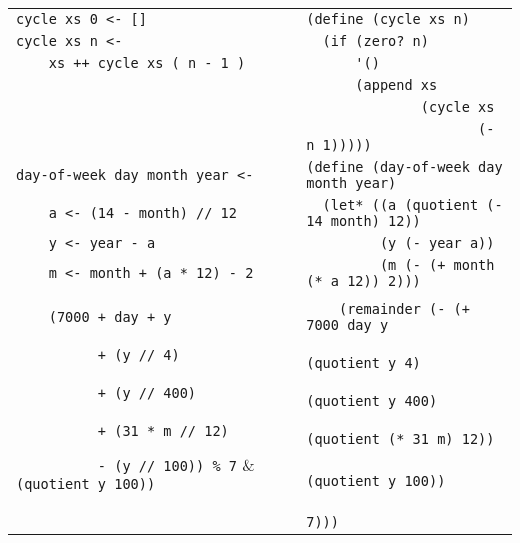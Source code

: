 \begin{table}[ht!]
\begin{tabular}{|l|l|}
            \verb,cycle xs 0 <- [],            & \verb,(define (cycle xs n), \\
            \verb,cycle xs n <- ,              & \verb,  (if (zero? n),\\
            \verb,    xs ++ cycle xs ( n - 1 ),& \verb,      '(), \\
                                               & \verb,      (append xs, \\
                                               & \verb,              (cycle xs, \\
                                               & \verb,                     (- n 1))))), \\ \hline
            
            \verb,day-of-week day month year <-,& \verb,(define (day-of-week day month year), \\
            \verb,    a <- (14 - month) // 12,  & \verb,  (let* ((a (quotient (- 14 month) 12)),\\
            \verb,    y <- year - a,            & \verb,         (y (- year a)), \\
            \verb,    m <- month + (a * 12) - 2,& \verb,         (m (- (+ month (* a 12)) 2))), \\
                                                & \\
            \verb,    (7000 + day + y,          & \verb,    (remainder (- (+ 7000 day y, \\
            \verb,          + (y // 4),         & \verb,                     (quotient y 4), \\
            \verb,          + (y // 400),       & \verb,                     (quotient y 400),\\
            \verb,          + (31 * m // 12),   & \verb,                     (quotient (* 31 m) 12)),\\
            \verb,          - (y // 100)) % 7,  & \verb,                     (quotient y 100)), \\
                                                & \verb,                     7))), \\ \hline
        \end{tabular}
    \end{table}
    \clearpage
